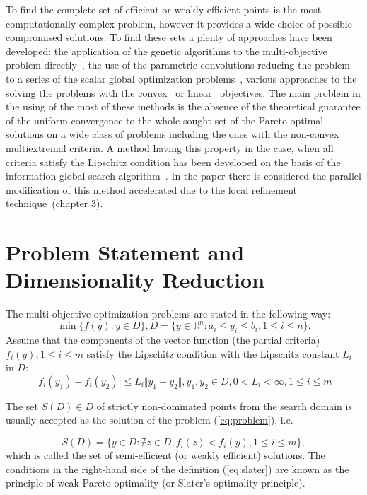 \documentclass{llncs}
\begin{document}
To find the complete set of efficient or weakly efficient points is the most computationally
complex problem, however it provides a wide choice of possible compromised solutions. To find these sets a
plenty of approaches have been developed: the application of the
genetic algorithms to the multi-objective problem directly~\cite{DebPratap2002}, the use of the
parametric convolutions reducing the problem to a series of the scalar global optimization
problems~\cite{GergelKozinov2017}, various approaches to the solving the problems with the
convex~\cite{ZhangZuo2013} or linear~\cite{Benson1998} objectives. The main problem in the
using of the most of these methods is the absence of the theoretical guarantee of the uniform
convergence to the whole sought set of the Pareto-optimal solutions on a wide class of
problems including the ones with the non-convex multiextremal criteria. A method having this
property in the case, when all criteria satisfy the Lipschitz condition has been developed on the
basis of the information global search algorithm~\cite{markinStrongin1993}.
In the paper there is considered the parallel modification of this method accelerated due to the local refinement
technique~\cite{strOptBook}(chapter 3).

\section{Problem Statement and Dimensionality Reduction}
The multi-objective optimization problems are stated in the following way:
\begin{equation}
  \label{eq:problem}
  \min\{f(y): y\in D\}, D=\{y\in \mathbb{R}^n: a_i \leqslant y_i \leqslant b_i, 1\leqslant i
\leqslant n \}.
\end{equation}
Assume that the components of the vector function (the partial criteria) \(f_i(y), 1\leqslant
i\leqslant m\) satisfy the Lipschitz condition with the Lipschitz constant \(L_i\) in \(D\):
\begin{displaymath}
\label{lip}
|f_i(y_1)-f_i(y_2)|\leqslant L_i\Vert y_1-y_2\Vert,y_1,y_2\in D,0<L_i<\infty,1\leqslant i
\leqslant m
\end{displaymath}

The set \(S(D)\in D\) of strictly non-dominated points from the search domain is usually accepted as the
solution of the problem (\ref{eq:problem}), i.e.

\begin{equation}
  \label{eq:slater}
  S(D) = \{y\in D: \nexists z\in D, f_i(z)<f_i(y),1\leqslant i \leqslant m\},
\end{equation}
which is called the set of semi-efficient (or weakly efficient) solutions. The
conditions in the right-hand side of the definition (\ref{eq:slater}) are known as the principle of
weak Pareto-optimality (or Slater's optimality principle).
\end{document}
